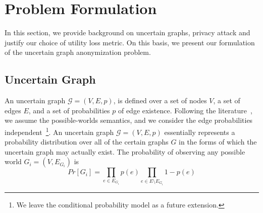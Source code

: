\section{Problem Formulation}
\label{sec:notation}

In this section, we provide background on uncertain graphs, privacy attack and justify our choice of utility loss metric. 
On this basis, we present our formulation of the uncertain graph anonymization problem. 

\subsection{Uncertain Graph}
An uncertain graph $\mathcal{G}=(V,E,\mathit{p})$, is defined over a set of nodes $V$, a set of edges $E$, and a set of probabilities $\mathit{p}$ of edge existence. Following the literature~\cite{Potamias_K_2010,Zhao_Detecting_2014,Colbourn_Colbourn_1987}, we assume the possible-worlds semantics, and we consider the edge probabilities independent~\footnote{We leave the conditional probability model as a future
extension.}. An uncertain graph $\mathcal{G}=(V,E,\mathit{p})$ essentially represents a probability distribution over all of the certain graphs $G$ in the forms of which the uncertain graph may actually exist. 
The probability of observing any possible world $G_i=(V,E_{G_i})$ is    
\begin{equation*}
    Pr[G_i]=\prod_{e \in E_{G_i}} {\mathit{p}(e)} \prod_{e \in E \setminus E_{G_i}} 1-\mathit{p}(e)
\end{equation*}
